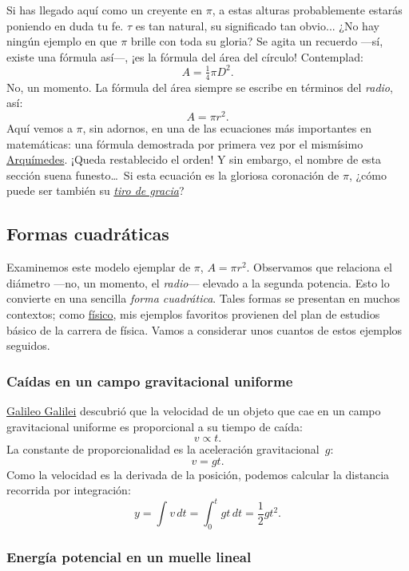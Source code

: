 Si has llegado aquí como un creyente en $\pi$, a estas alturas probablemente estarás poniendo en duda tu fe. $\tau$ es tan natural, su significado tan obvio... ¿No hay ningún ejemplo en que $\pi$ brille con toda su gloria? Se agita un recuerdo ---sí, existe una fórmula así---, ¡es la fórmula del área del círculo! Contemplad:
\[ A = \tfrac{1}{4} \pi D^2. \]
No, un momento. La fórmula del área siempre se escribe en términos del \emph{radio}, así:
\[ A = \pi r^2. \]
Aquí vemos a $\pi$, sin adornos, en una de las ecuaciones más importantes en matemáticas: una fórmula demostrada por primera vez por el mismísimo \href{https://es.wikipedia.org/wiki/Arquímedes}{Arquímedes}. ¡Queda restablecido el orden! Y sin embargo, el nombre de esta sección suena funesto\ldots\ Si esta ecuación es la gloriosa coronación de $\pi$, ¿cómo puede ser también su \href{https://es.wikipedia.org/wiki/Tiro_de_gracia}{\emph{tiro de gracia}}?


  \subsection{Formas cuadráticas} %
  \label{sec:quadratic_forms}

Examinemos este modelo ejemplar de $\pi$, $A = \pi r^2$. Observamos que relaciona el diámetro ---no, un momento, el \emph{radio}--- elevado a la segunda potencia. Esto lo convierte en una sencilla \emph{forma cuadrática}. Tales formas se presentan en muchos contextos; como \href{http://thesis.library.caltech.edu/1940/}{físico}, mis ejemplos favoritos provienen del plan de estudios básico de la carrera de física. Vamos a considerar unos cuantos de estos ejemplos seguidos.

    \subsubsection{Caídas en un campo gravitacional uniforme} %
    \label{sec:falling_in_a_uniform_gravitational_field}

\href{https://es.wikipedia.org/wiki/Galileo_Galilei}{Galileo Galilei} descubrió que la velocidad de un objeto que cae en un campo gravitacional uniforme es proporcional a su tiempo de caída:
\[ v \propto t. \]
La constante de proporcionalidad es la aceleración gravitacional~$g$:
\[ v = g t. \]
Como la velocidad es la derivada de la posición, podemos calcular la distancia recorrida por integración:
\[ y = \int v\,dt = \int_0^t gt\,dt = \textstyle{\frac{1}{2}} gt^2. \]


    \subsubsection{Energía potencial en un muelle lineal} %
    \label{sec:potential_energy_in_a_linear_spring}

